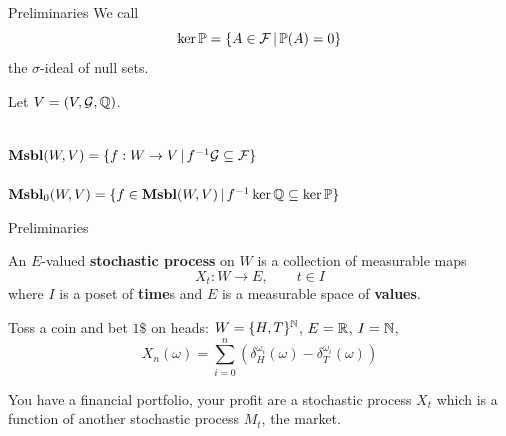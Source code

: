 \begin{frame}{Preliminaries}
	We call
	\begin{equation*}
		\ker \mathbb{P} = \{A \in \mathcal{F} \,|\, \mathbb{P}(A) = 0 \}
	\end{equation*}
	the $\sigma$-ideal of null sets.

	Let $V = (V, \mathcal{G}, \mathbb{Q})$.
	\begin{center}
		\\
		$\mathbf{Msbl}(W, V) = \{ f : W \to V \,|\, f^{-1}\mathcal{G} \subseteq \mathcal{F}\}$\\[2ex]

		\\
		$\mathbf{Msbl}_0(W, V) = \{ f \in \mathbf{Msbl}(W, V) \,|\, f^{-1}\ker\mathbb{Q} \subseteq \ker \mathbb{P}\}$
	\end{center}
\end{frame}

\begin{frame}{Preliminaries}
	\begin{definition}
		An $E$-valued \textbf{stochastic process} on $W$ is a collection of measurable maps
		\begin{equation*}
			X_t : W \to E, \qquad t \in I
		\end{equation*}
		where $I$ is a poset of \textbf{time}s and $E$ is a measurable space of \textbf{values}.
	\end{definition}

	\begin{example}
		Toss a coin and bet $1\$$ on heads: $W = \{H,T\}^{\mathbb{N}}$, $E = \mathbb{R}$, $I = \mathbb{N}$,
		\begin{equation*}
			X_n(\omega) = \sum_{i=0}^n (\delta^{\omega_i}_H(\omega) - \delta^{\omega_i}_T(\omega))
		\end{equation*}
	\end{example}
	\vspace{-3ex}
	\begin{example}
		You have a financial portfolio, your profit are a stochastic process $X_t$ which is a function of another stochastic process $M_t$, the market.
	\end{example}
\end{frame}

